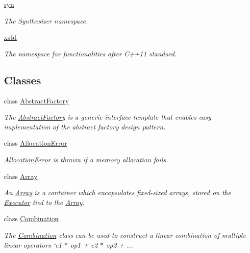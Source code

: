 \begin{DoxyCompactItemize}
 \hyperlink{namespacegko_1_1syn}{syn}
\begin{DoxyCompactList}\small\item\em The Synthesizer namespace. \end{DoxyCompactList}\item 
 \hyperlink{namespacegko_1_1xstd}{xstd}
\begin{DoxyCompactList}\small\item\em The namespace for functionalities after C++11 standard. \end{DoxyCompactList}\end{DoxyCompactItemize}
\subsection*{Classes}
\begin{DoxyCompactItemize}
\item 
class \hyperlink{classgko_1_1AbstractFactory}{Abstract\+Factory}
\begin{DoxyCompactList}\small\item\em The \hyperlink{classgko_1_1AbstractFactory}{Abstract\+Factory} is a generic interface template that enables easy implementation of the abstract factory design pattern. \end{DoxyCompactList}\item 
class \hyperlink{classgko_1_1AllocationError}{Allocation\+Error}
\begin{DoxyCompactList}\small\item\em \hyperlink{classgko_1_1AllocationError}{Allocation\+Error} is thrown if a memory allocation fails. \end{DoxyCompactList}\item 
class \hyperlink{classgko_1_1Array}{Array}
\begin{DoxyCompactList}\small\item\em An \hyperlink{classgko_1_1Array}{Array} is a container which encapsulates fixed-\/sized arrays, stored on the \hyperlink{classgko_1_1Executor}{Executor} tied to the \hyperlink{classgko_1_1Array}{Array}. \end{DoxyCompactList}\item 
class \hyperlink{classgko_1_1Combination}{Combination}
\begin{DoxyCompactList}\small\item\em The \hyperlink{classgko_1_1Combination}{Combination} class can be used to construct a linear combination of multiple linear operators `c1 $\ast$ op1 + c2 $\ast$ op2 + ... \end{DoxyCompactList}\item 

\end{DoxyCompactItemize}
